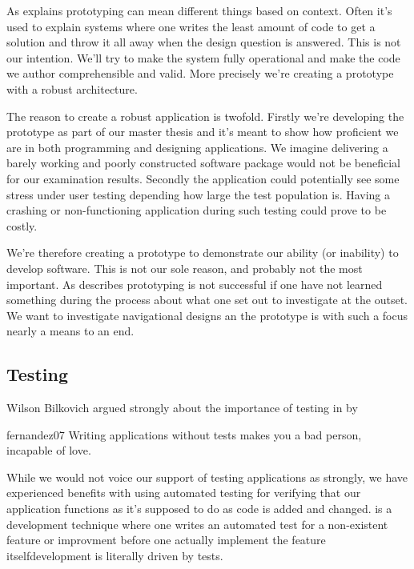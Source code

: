 As \citet[]{mcconnell04} explains prototyping can mean different things
based on context. Often it's used to explain systems where one writes the
least amount of code to get a solution and throw it all away when the design
question is answered. This is not our intention. We'll try to make the system
fully operational and make the code we author comprehensible and
valid. More precisely we're creating a  prototype
\cite[]{rudd96} with a robust architecture.

The reason to create a robust application is twofold. Firstly we're developing
the prototype as part of our master thesis and it's meant to show how
proficient we are in both programming and designing applications. We
imagine delivering a barely working and poorly constructed software package
would not be beneficial for our examination results.
Secondly the application could potentially see some stress under user testing
depending how large the test population is. Having a crashing or
non-functioning application during such testing could prove to be costly.

We're therefore creating a prototype to demonstrate our ability (or inability)
to develop software. This is not our sole reason, and probably not the most
important. As \citet[]{mayhew90} describes prototyping is not
successful if one have not learned something during the process about what one
set out to investigate at the outset. We want to investigate navigational
designs an the prototype is with such a focus nearly a means to an end.

\subsection{Testing}

Wilson Bilkovich argued strongly about the importance of testing in
 by
\begin{fullquote}[\p{551}]{fernandez07}{}
  Writing applications without tests makes you a bad person,
  incapable of love.
\end{fullquote}

While we would not voice our support of testing applications as strongly,
we have experienced benefits with using automated testing for verifying
that our application functions as it's supposed to do as code is added
and changed.  is a development technique
where one writes an automated test for a non-existent feature or
improvment before one actually implement the feature itself\dash{}development
is literally driven by tests.

